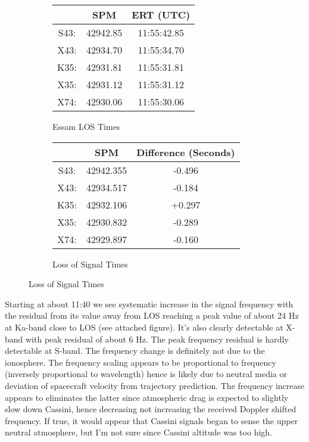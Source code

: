 \documentclass[crop=false,class=article,oneside]{standalone}
\begin{document}
\begin{figure}
    \centering
    \captionsetup{type=table}
    \begin{subfigure}[b]{0.49\textwidth}
        \centering
        \caption{Essam LOS Times}
        \begin{tabular}{c c c} 
            \hline
             & SPM      & ERT (UTC)    \\ 
            \hline
            S43: & 42942.85 & 11:55:42.85  \\
            X43: & 42934.70 & 11:55:34.70  \\
            K35: & 42931.81 & 11:55:31.81  \\
            X35: & 42931.12 & 11:55:31.12  \\
            X74: & 42930.06 & 11:55:30.06  \\
            \hline
        \end{tabular}
    \end{subfigure}
    \begin{subfigure}[b]{0.49\textwidth}
        \centering
        \captionsetup{type=table}
        \caption{Loss of Signal Times}
        \begin{tabular}{c c c} 
            \hline
            & SPM      & Difference (Seconds)    \\ 
            \hline
            S43: & 42942.355 & -0.496    \\
            X43: & 42934.517 & -0.184    \\
            K35: & 42932.106 & +0.297    \\
            X35: & 42930.832 & -0.289    \\
            X74: & 42929.897 & -0.160    \\
            \hline
        \end{tabular}
    \end{subfigure}
\end{figure}
Starting at about 11:40 we see systematic increase in the signal frequency with the residual from its value away from LOS reaching a peak value of about 24 Hz at Ka-band close to LOS (see attached figure).  It's also clearly detectable at X-band with peak residual of about 6 Hz. The peak frequency residual is hardly detectable at S-band. The frequency change is definitely not due to the ionosphere. The frequency scaling appears to be proportional to frequency (inversely proportional to wavelength) hence is likely due to neutral media or deviation of spacecraft velocity from trajectory prediction.  The frequency increase appears to eliminates the latter since atmospheric drag is expected to slightly slow down Cassini, hence decreasing not increasing the received Doppler shifted frequency. If true, it would appear that Cassini signals began to sense the upper neutral atmosphere, but I'm not sure since Cassini altitude was too high.
\end{document}
